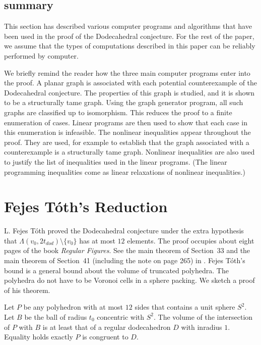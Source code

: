 \subsection{summary}

This section has described various computer programs 
and algorithms that
have been used in the proof of the Dodecahedral conjecture.
For the rest of the paper, we assume that the types of
computations described in this paper can be reliably performed
by computer.

We briefly remind the reader how the three main computer programs
enter into the proof.  A planar graph is associated with
each potential counterexample of the Dodecahedral conjecture.
The properties of this graph is studied, and it is shown to
be a structurally tame graph.  Using the graph generator program,
all such graphs are classified up to isomorphism.  This
reduces the proof to a finite enumeration of cases. Linear programs
are then used to show that each case in this enumeration is 
infeasible.  The nonlinear inequalities appear throughout the proof.
They are used, for example to establish that the graph associated
with a counterexample is a structurally tame graph.  Nonlinear
inequalities are also used to justify the list of inequalities
used in the linear programs. (The linear programming inequalities
come as linear relaxations of nonlinear inequalities.)



\section{Fejes T\'oth's Reduction}

L. Fejes T\'oth proved  the Dodecahedral conjecture 
under the extra hypothesis that $\Lambda(v_0,2t_{dod})\setminus\{v_0\}$
has at most $12$  elements.  The proof occupies about
eight pages of the book {\it Regular Figures}.  See the main
theorem of
Section~33 and the main theorem of Section~41 (including
the note on page 265) in \cite{Toth2}.  Fejes T\'oth's
bound is a general bound about the volume of truncated polyhedra.
The polyhedra do not have to be Voronoi cells in a sphere packing.
We sketch a proof of his theorem.

\begin{theorem}  Let $P$ be any polyhedron with at most $12$ sides
that contains a unit sphere $S^2$.  Let $B$ be the ball of
radius $t_0$ concentric with $S^2$.  The volume of the intersection
of $P$ with $B$ is
at least that of a regular
dodecahedron $D$ with inradius $1$.
Equality holds exactly $P$ is congruent to $D$.
\end{theorem}


